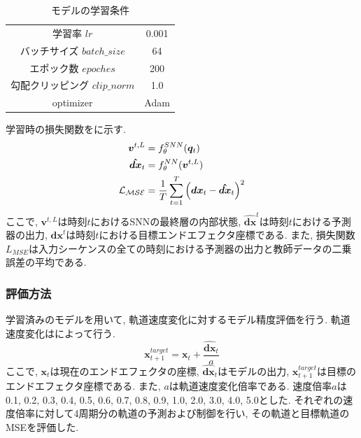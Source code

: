 \begin{table}[htb]
    \centering
    \caption{モデルの学習条件}
    \label{tab:exp3:train:parameter}
    \begin{tabular}{cc}
        \hline
        学習率 $lr$ & 0.001\\
        バッチサイズ $batch\_size$ & 64\\
        エポック数 $epoches$ & 200\\
        勾配クリッピング $clip\_norm$ & 1.0\\
        optimizer & Adam\\
        \hline
    \end{tabular}
\end{table}

学習時の損失関数をに示す.
\begin{align}
    \bm{v}^{t,L} &= f_{\theta}^{SNN}(\bm{q}_{t}) \notag \\
    \bm{\hat{dx}}_{t} &= f_{\theta}^{NN}(\bm{v}^{t,L}) \notag \\
    \mathcal{L_{MSE}} &= \frac{1}{T} \sum_{t=1}^{T} \left( \bm{dx}_{t} - \bm{\hat{dx}}_{t} \right)^2 \label{eq:exp3:loss}
\end{align}
ここで, $\bm{v}^{t,L}$は時刻$t$におけるSNNの最終層の内部状態, $\bm{\hat{dx}}^{t}$は時刻$t$における予測器の出力, $\bm{dx}^{t}$は時刻$t$における目標エンドエフェクタ座標である.
また, 損失関数$L_{MSE}$は入力シーケンスの全ての時刻における予測器の出力と教師データの二乗誤差の平均である.


\subsubsection{評価方法}
学習済みのモデルを用いて, 軌道速度変化に対するモデル精度評価を行う.
軌道速度変化はによって行う.
\begin{equation}
    \bm{x}_{t+1}^{target} = \bm{x}_{t} + \frac{\bm{\hat{dx}}_{t}} {a} \label{eq:exp3:target_trajectoryx}
\end{equation}
ここで, $\bm{x}_{t}$は現在のエンドエフェクタの座標, $\bm{\hat{dx}}_{t}$はモデルの出力, $\bm{x}_{t+1}^{target}$は目標のエンドエフェクタ座標である.
また, $a$は軌道速度変化倍率である.
速度倍率$a$は0.1, 0.2, 0.3, 0.4, 0.5, 0.6, 0.7, 0.8, 0.9, 1.0, 2.0, 3.0, 4.0, 5.0とした.
それぞれの速度倍率に対して4周期分の軌道の予測および制御を行い, その軌道と目標軌道のMSEを評価した.

